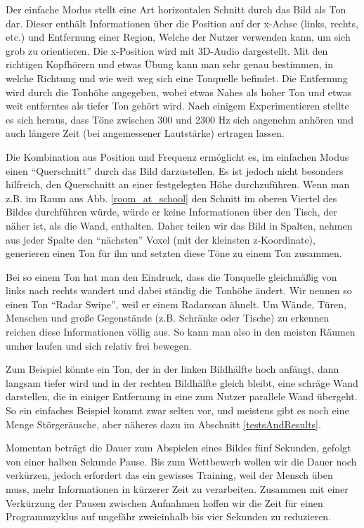 \documentclass[a4paper,12pt,ngerman]{scrartcl}
\begin{document}
Der einfache Modus stellt eine Art horizontalen Schnitt durch das Bild als Ton dar. Dieser enthält Informationen
über die Position auf der x-Achse (links, rechts, etc.) und Entfernung einer Region, Welche der Nutzer verwenden kann,
um sich grob zu orientieren. Die x-Position wird mit 3D-Audio dargestellt. Mit den richtigen Kopfhörern und etwas Übung
kann man sehr genau bestimmen, in welche Richtung und wie weit weg sich eine Tonquelle befindet. Die Entfernung wird
durch die Tonhöhe angegeben, wobei etwas Nahes als hoher Ton und etwas weit entferntes als tiefer Ton gehört wird.
Nach einigem Experimentieren stellte es sich heraus, dass Töne zwischen 300 und 2300 Hz sich angenehm anhören und auch
längere Zeit (bei angemessener Lautstärke) ertragen lassen. \par 
Die Kombination aus Position und Frequenz ermöglicht es, im
einfachen Modus einen \enquote{Querschnitt} durch das Bild darzustellen. Es ist jedoch nicht besonders hilfreich, 
den Querschnitt an einer festgelegten Höhe durchzuführen. Wenn man z.B. im Raum aus Abb. \ref{room_at_school} den Schnitt im oberen Viertel des Bildes durchführen würde, würde er keine Informationen über den Tisch, der näher ist, als
die Wand, enthalten. Daher teilen wir das Bild in Spalten, nehmen aus jeder Spalte den \enquote{nächsten} Voxel 
(mit der kleinsten z-Koordinate), generieren einen Ton für ihn und setzten diese Töne zu einem Ton zusammen. \par
Bei so einem Ton hat man den Eindruck, dass die Tonquelle gleichmäßig von links nach rechts wandert und dabei ständig
die Tonhöhe ändert. Wir nennen so einen Ton \enquote{Radar Swipe}, weil er einem Radarscan ähnelt.
Um Wände, Türen, Menschen und große Gegenstände (z.B. Schränke oder Tische) zu erkennen reichen diese Informationen völlig aus. So kann man also in den meisten Räumen umher laufen und sich relativ frei bewegen.\par
Zum Beispiel könnte ein Ton, der in der linken Bildhälfte hoch anfängt, dann langsam tiefer wird und 
in der rechten Bildhälfte gleich bleibt, eine schräge Wand darstellen, die in einiger Entfernung in eine
zum Nutzer parallele Wand übergeht. So ein einfaches Beispiel kommt zwar selten vor, und meistens gibt es
noch eine Menge Störgeräusche, aber näheres dazu im Abschnitt \ref{testsAndResults}.\par 
Momentan beträgt die Dauer zum Abspielen eines Bildes fünf Sekunden, gefolgt von einer halben Sekunde 
Pause. Bis zum Wettbewerb wollen wir die Dauer noch verkürzen, jedoch erfordert das ein gewisses 
Training, weil der Mensch üben muss, mehr Informationen in kürzerer Zeit zu verarbeiten. Zusammen mit 
einer Verkürzung der Pausen zwischen Aufnahmen hoffen wir die Zeit für einen Programmzyklus auf ungefähr
zweieinhalb bis vier Sekunden zu reduzieren. 
\end{document}
